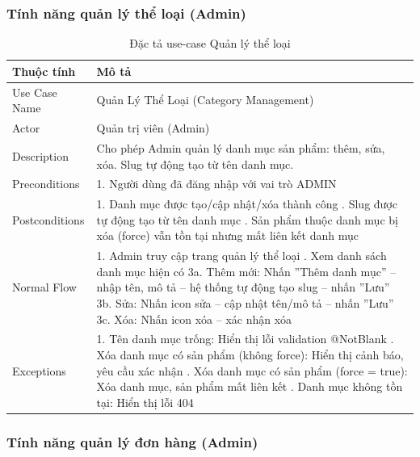 \subsubsection{Tính năng quản lý thể loại (Admin)}

\begin{table}[H]
\centering
\begin{tabular}{|l|p{11cm}|}
\hline
\textbf{Thuộc tính} & \textbf{Mô tả} \\
\hline
Use Case Name & Quản Lý Thể Loại (Category Management) \\
\hline
Actor & Quản trị viên (Admin) \\
\hline
Description & Cho phép Admin quản lý danh mục sản phẩm: thêm, sửa, xóa. Slug tự động tạo từ tên danh mục. \\
\hline
Preconditions & 1. Người dùng đã đăng nhập với vai trò ADMIN \\
\hline
Postconditions & 1. Danh mục được tạo/cập nhật/xóa thành công \newline 2. Slug được tự động tạo từ tên danh mục \newline 3. Sản phẩm thuộc danh mục bị xóa (force) vẫn tồn tại nhưng mất liên kết danh mục \\
\hline
Normal Flow & 1. Admin truy cập trang quản lý thể loại \newline 2. Xem danh sách danh mục hiện có \newline 3a. Thêm mới: Nhấn ''Thêm danh mục'' -- nhập tên, mô tả -- hệ thống tự động tạo slug -- nhấn ''Lưu'' \newline 3b. Sửa: Nhấn icon sửa -- cập nhật tên/mô tả -- nhấn ''Lưu'' \newline 3c. Xóa: Nhấn icon xóa -- xác nhận xóa \\
\hline
Exceptions & 1. Tên danh mục trống: Hiển thị lỗi validation @NotBlank \newline 2. Xóa danh mục có sản phẩm (không force): Hiển thị cảnh báo, yêu cầu xác nhận \newline 3. Xóa danh mục có sản phẩm (force = true): Xóa danh mục, sản phẩm mất liên kết \newline 4. Danh mục không tồn tại: Hiển thị lỗi 404 \\
\hline
\end{tabular}
\caption{Đặc tả use-case Quản lý thể loại}
\label{tab:uc013}
\end{table}

\subsubsection{Tính năng quản lý đơn hàng (Admin)}

